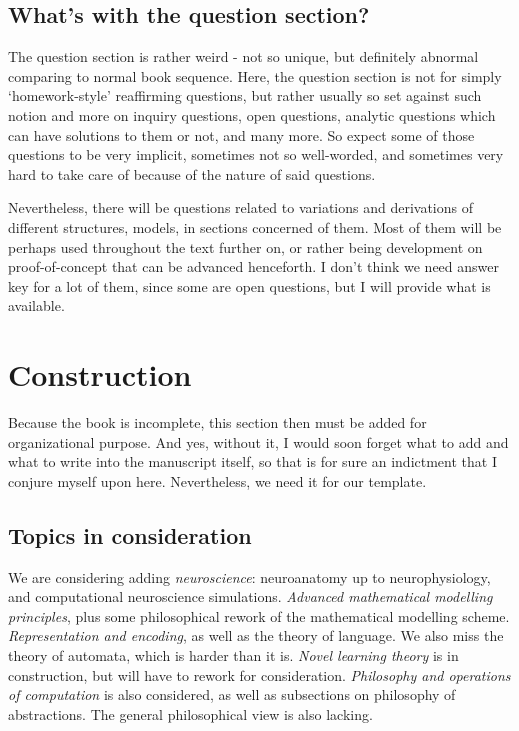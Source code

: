 \subsection{What's with the question section?}

The question section is rather weird - not so unique, but definitely abnormal comparing to normal book sequence. Here, the question section is not for simply `homework-style' reaffirming questions, but rather usually so set against such notion and more on inquiry questions, open questions, analytic questions which can have solutions to them or not, and many more. So expect some of those questions to be very implicit, sometimes not so well-worded, and sometimes very hard to take care of because of the nature of said questions. 

Nevertheless, there will be questions related to variations and derivations of different structures, models, in sections concerned of them. Most of them will be perhaps used throughout the text further on, or rather being development on proof-of-concept that can be advanced henceforth. I don't think we need answer key for a lot of them, since some are open questions, but I will provide what is available. 

\section{Construction}
Because the book is incomplete, this section then must be added for organizational purpose. And yes, without it, I would soon forget what to add and what to write into the manuscript itself, so that is for sure an indictment that I conjure myself upon here. Nevertheless, we need it for our template. 

\subsection{Topics in consideration}
We are considering adding \textit{neuroscience}: neuroanatomy up to neurophysiology, and computational neuroscience simulations. \textit{Advanced mathematical modelling principles}, plus some philosophical rework of the mathematical modelling scheme. \textit{Representation and encoding}, as well as the theory of language. We also miss the theory of automata, which is harder than it is. \textit{Novel learning theory} is in construction, but will have to rework for consideration. \textit{Philosophy and operations of computation} is also considered, as well as subsections on philosophy of abstractions. The general philosophical view is also lacking. 

